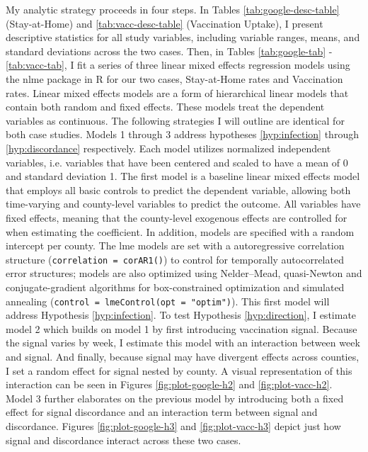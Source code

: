 My analytic strategy proceeds in four steps. In Tables
\ref{tab:google-desc-table} (Stay-at-Home) and \ref{tab:vacc-desc-table}
(Vaccination Uptake), I present descriptive statistics for all study variables,
including variable ranges, means, and standard deviations across the two cases.
Then, in Tables \ref{tab:google-tab} - \ref{tab:vacc-tab}, I fit a series of
three linear mixed effects regression models using the nlme package in R
\citep{pinheiro_etal21, pinheiro_bates00} for our two cases, Stay-at-Home rates
and Vaccination rates. Linear mixed effects models are a form of hierarchical
linear models that contain both random and fixed effects. These models treat the
dependent variables as continuous. The following strategies I will outline are
identical for both case studies. Models 1 through 3 address hypotheses
\ref{hyp:infection} through \ref{hyp:discordance} respectively. Each model
utilizes normalized independent variables, i.e. variables that have been
centered and scaled to have a mean of 0 and standard deviation 1. The first
model is a baseline linear mixed effects model that employs all basic controls
to predict the dependent variable, allowing both time-varying and county-level
variables to predict the outcome. All variables have fixed effects, meaning that
the county-level exogenous effects are controlled for when estimating the
coefficient. In addition, models are specified with a random intercept per
county. The lme models are set with a autoregressive correlation structure
(\texttt{correlation\ =\ corAR1()}) to control for temporally autocorrelated
error structures; models are also optimized using Nelder--Mead, quasi-Newton and
conjugate-gradient algorithms for box-constrained optimization and simulated
annealing (\texttt{control\ =\ lmeControl(opt\ =\ "optim")}). This first model
will address Hypothesis \ref{hyp:infection}. To test Hypothesis
\ref{hyp:direction}, I estimate model 2 which builds on model 1 by first
introducing vaccination signal. Because the signal varies by week, I estimate
this model with an interaction between week and signal. And finally, because
signal may have divergent effects across counties, I set a random effect for
signal nested by county. A visual representation of this interaction can be seen
in Figures \ref{fig:plot-google-h2} and \ref{fig:plot-vacc-h2}. Model 3 further
elaborates on the previous model by introducing both a fixed effect for signal
discordance and an interaction term between signal and discordance. Figures
\ref{fig:plot-google-h3} and \ref{fig:plot-vacc-h3} depict just how signal and
discordance interact across these two cases.


